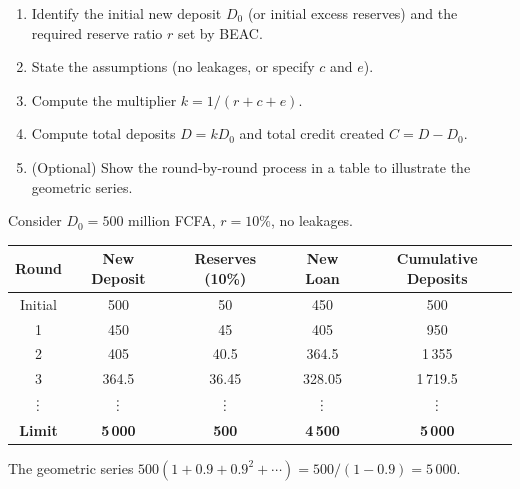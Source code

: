 \documentclass[11pt]{article}
\newcommand{\cle}[1]{{\popxbold\color{popdark}#1}}
\def\vdots{\mathord{\vbox{\baselineskip3.2pt\lineskiplimit0pt\kern4pt\hbox{.}\hbox{.}\hbox{.}}}}%
\begin{document}
\begin{methode}
\begin{enumerate}
\item Identify the \cle{initial new deposit} $D_0$ (or initial excess reserves) and the \cle{required reserve ratio} $r$ set by BEAC.
\item State the assumptions (no leakages, or specify $c$ and $e$).
\item Compute the multiplier $k = 1/(r+c+e)$.
\item Compute total deposits $D = k D_0$ and total credit created $C = D - D_0$.
\item (Optional) Show the round-by-round process in a table to illustrate the geometric series.
\end{enumerate}
\end{methode}

\begin{experience}
Consider $D_0 = 500$ million FCFA, $r = 10\%$, no leakages.
\begin{center}
\begin{tabular}{|c|c|c|c|c|}
\hline
\rowcolor{popblueL} \textbf{Round} & \textbf{New Deposit} & \textbf{Reserves (10\%)} & \textbf{New Loan} & \textbf{Cumulative Deposits} \\
\hline
Initial & 500 & 50 & 450 & 500 \\
1 & 450 & 45 & 405 & 950 \\
2 & 405 & 40.5 & 364.5 & 1\,355 \\
3 & 364.5 & 36.45 & 328.05 & 1\,719.5 \\
$\vdots$ & $\vdots$ & $\vdots$ & $\vdots$ & $\vdots$ \\
\hline
\textbf{Limit} & \textbf{5\,000} & \textbf{500} & \textbf{4\,500} & \textbf{5\,000} \\
\hline
\end{tabular}
\end{center}
The geometric series $500(1 + 0.9 + 0.9^2 + \cdots) = 500/(1-0.9) = 5\,000$.
\end{experience}
\end{document}
